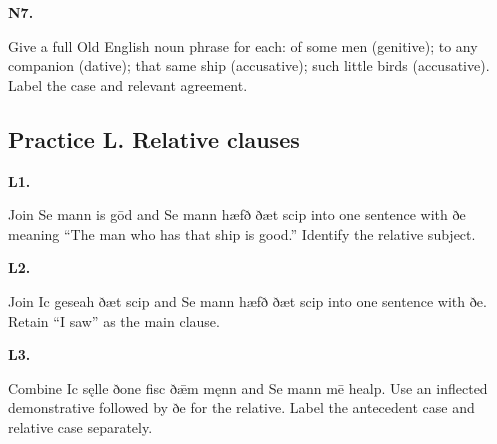 \par\begin{minipage}{\linewidth}\raggedright
\textbf{N7.}

Give a full Old English noun phrase for each: of some men (genitive); to any companion (dative); that same ship (accusative); such little birds (accusative). Label the case and relevant agreement.

\end{minipage}\par\addvspace{4pt}

\subsection*{Practice L. Relative clauses}

\par\begin{minipage}{\linewidth}\raggedright
\textbf{L1.}

Join Se mann is gōd and Se mann hæfð ðæt scip into one sentence with ðe meaning “The man who has that ship is good.” Identify the relative subject.

\end{minipage}\par\addvspace{4pt}

\par\begin{minipage}{\linewidth}\raggedright
\textbf{L2.}

Join Ic geseah ðæt scip and Se mann hæfð ðæt scip into one sentence with ðe. Retain “I saw” as the main clause.

\end{minipage}\par\addvspace{4pt}

\par\begin{minipage}{\linewidth}\raggedright
\textbf{L3.}

Combine Ic sęlle ðone fisc ðǣm męnn and Se mann mē healp. Use an inflected demonstrative followed by ðe for the relative. Label the antecedent case and relative case separately.

\end{minipage}\par\addvspace{4pt}

